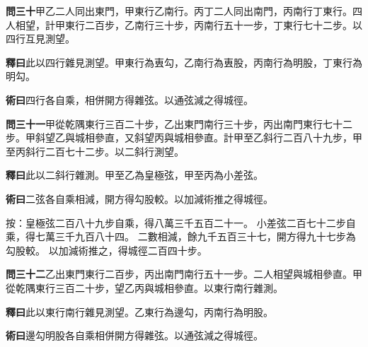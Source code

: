\documentclass[12pt,a4paper]{article}
\begin{document}
\vspace{0.5em}

\noindent\textbf{問三十}\quad 甲乙二人同出東門，甲東行乙南行。丙丁二人同出南門，丙南行丁東行。四人相望，計甲東行二百步，乙南行三十步，丙南行五十一步，丁東行七十二步。以四行互見測望。

\vspace{0.3em}

\noindent\textbf{釋曰}\quad 此以四行雜見測望。甲東行為叀勾，乙南行為叀股，丙南行為明股，丁東行為明勾。

\vspace{0.3em}

\noindent\textbf{術曰}\quad 四行各自乘，相併開方得雜弦。以通弦減之得城徑。

\vspace{0.5em}

\noindent\textbf{問三十一}\quad 甲從乾隅東行三百二十步，乙出東門南行三十步，丙出南門東行七十二步。甲斜望乙與城相參直，又斜望丙與城相參直。計甲至乙斜行二百八十九步，甲至丙斜行二百七十二步。以二斜行測望。

\vspace{0.3em}

\noindent\textbf{釋曰}\quad 此以二斜行雜測。甲至乙為皇極弦，甲至丙為小差弦。

\vspace{0.3em}

\noindent\textbf{術曰}\quad 二弦各自乘相減，開方得勾股較。以加減術推之得城徑。

\vspace{0.3em}

\noindent
按：皇極弦二百八十九步自乘，得八萬三千五百二十一。
小差弦二百七十二步自乘，得七萬三千九百八十四。
二數相減，餘九千五百三十七，開方得九十七步為勾股較。
以加減術推之，得城徑二百四十步。

\vspace{0.5em}

\noindent\textbf{問三十二}\quad 乙出東門東行二百步，丙出南門南行五十一步。二人相望與城相參直。甲從乾隅東行三百二十步，望乙丙與城相參直。以東行南行雜測。

\vspace{0.3em}

\noindent\textbf{釋曰}\quad 此以東行南行雜見測望。乙東行為邊勾，丙南行為明股。

\vspace{0.3em}

\noindent\textbf{術曰}\quad 邊勾明股各自乘相併開方得雜弦。以通弦減之得城徑。

\vspace{0.5em}
\end{document}
